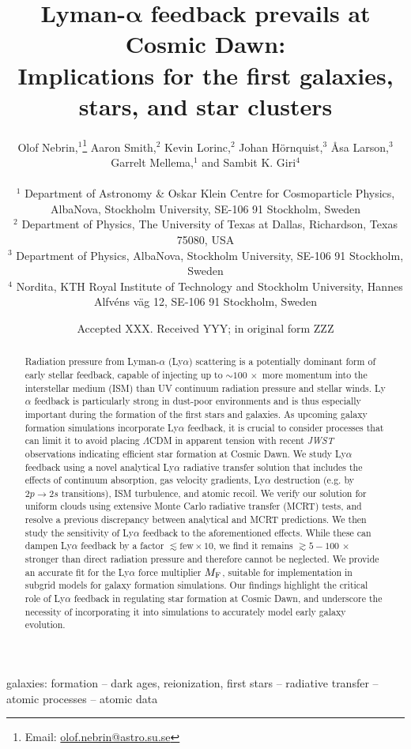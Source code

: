 \documentclass[fleqn,usenatbib]{mnras}
\title[Lyman-$\alpha$ radiation pressure feedback]{Lyman-$\boldsymbol{\alpha}$ feedback prevails at Cosmic Dawn: \\ Implications for the first galaxies, stars, and star clusters}
\author[O. Nebrin et al.]{
\parbox[t]{\textwidth}{
Olof Nebrin\orcid{0000-0003-3877-360X},$^1$\thanks{Email: \href{mailto:olof.nebrin@astro.su.se}{olof.nebrin@astro.su.se}} Aaron Smith\orcid{0000-0002-2838-9033},$^2$ Kevin Lorinc\orcid{0009-0005-3827-8774},$^2$ Johan Hörnquist\orcid{0000-0002-4291-2636},$^3$ Åsa Larson\orcid{0000-0003-2182-7165},$^3$ \\ Garrelt Mellema\orcid{0000-0002-2512-6748},$^1$ and Sambit K. Giri\orcid{0000-0002-2560-536X}$^4$}
\vspace*{6pt} \\
$^1$ Department of Astronomy \& Oskar Klein Centre for Cosmoparticle Physics, AlbaNova, Stockholm University, SE-106 91 Stockholm, Sweden \\ $^2$ Department of Physics, The University of Texas at Dallas, Richardson, Texas 75080, USA \\ $^3$ Department of Physics, AlbaNova, Stockholm University, SE-106 91 Stockholm, Sweden \\ $^4$ Nordita, KTH Royal Institute of Technology and Stockholm University, Hannes Alfvéns väg 12, SE-106 91 Stockholm, Sweden}
\date{Accepted XXX. Received YYY; in original form ZZZ}
\begin{document}
\label{firstpage}
\pagerange{\pageref{firstpage}--\pageref{lastpage}}
\maketitle

\begin{abstract}
Radiation pressure from Lyman-$\alpha$ (Ly$\alpha$) scattering is a potentially dominant form of early stellar feedback, capable of injecting up to $\sim 100 \, \times$ more momentum into the interstellar medium (ISM) than UV continuum radiation pressure and stellar winds. Ly$\alpha$ feedback is particularly strong in dust-poor environments and is thus especially important during the formation of the first stars and galaxies. As upcoming galaxy formation simulations incorporate Ly$\alpha$ feedback, it is crucial to consider processes that can limit it to avoid placing $\Lambda$CDM in apparent tension with recent \textit{JWST} observations indicating efficient star formation at Cosmic Dawn. We study Ly$\alpha$ feedback using a novel analytical Ly$\alpha$ radiative transfer solution that includes the effects of continuum absorption, gas velocity gradients, Ly$\alpha$ destruction (e.g. by $2p \rightarrow 2s$ transitions), ISM turbulence, and atomic recoil. We verify our solution for uniform clouds using extensive Monte Carlo radiative transfer (MCRT) tests, and resolve a previous discrepancy between analytical and MCRT predictions. We then study the sensitivity of Ly$\alpha$ feedback to the aforementioned effects. While these can dampen Ly$\alpha$ feedback by a factor $\lesssim \textrm{few} \times 10$, we find it remains $\gtrsim 5 - 100 \, \times$ stronger than direct radiation pressure and therefore cannot be neglected. We provide an accurate fit for the Ly$\alpha$ force multiplier $M_{\rm F}$, suitable for implementation in subgrid models for galaxy formation simulations. Our findings highlight the critical role of Ly$\alpha$ feedback in regulating star formation at Cosmic Dawn, and underscore the necessity of incorporating it into simulations to accurately model early galaxy evolution.

\end{abstract}

\begin{keywords}
galaxies: formation -- dark ages, reionization, first stars -- radiative transfer -- atomic processes -- atomic data
\end{keywords}
\end{document}
